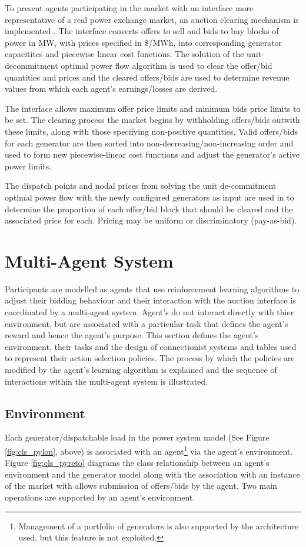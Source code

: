 To present agents participating in the market with an interface more
representative of a real power exchange market, an auction clearing
mechanism is implemented \cite[p.92]{pserc:mp_manual}.  The interface
converts offers to sell and bids to buy blocks of power in MW, with prices
specified in \$/MWh, into corresponding generator capacitites and piecewise
linear cost functions.  The solution of the unit-decommitment optimal power
flow algorithm is used to clear the offer/bid quantities and prices and the
cleared offers/bids are used to determine revenue values from which each
agent's earnings/losses are derived.

The interface allows maximum offer price limits and minimum bids price limits
to be set.  The clearing process the market begins by withholding offers/bids
outwith these limits, along with those specifying non-positive quantities.
Valid offers/bids for each generator are then sorted into
non-decreasing/non-increasing order and used to form new piecewise-linear cost
functions and adjust the generator's active power limits.

The dispatch points and nodal prices from solving the unit de-commitment
optimal power flow with the newly configured generators as input are used in
to determine the proportion of each offer/bid block that should be
cleared and the associated price for each.  Pricing may be uniform or
discriminatory (pay-as-bid).

\section{Multi-Agent System}
\label{sec:mas}
Participants are modelled as agents that use reinforcement learning algorithms
to adjust their bidding behaviour and their interaction with the auction
interface is coordinated by a multi-agent system.  Agent's do not interact
directly with thier environment, but are associated with a particular task
that defines the agent's reward and hence the agent's purpose.  This section
defines the agent's environment, their tasks and the design of connectionist
systems and tables used to represent their action selection policies.  The
process by which the policies are modified by the agent's learning algorithm is
explained and the sequence of interactions within the multi-agent system is
illustrated.

\subsection{Environment}
Each generator/dispatchable load in the power system model (See Figure
\ref{fig:cls_pylon}, above) is associated with an agent\footnote{Management of
a portfolio of generators is also supported by the architecture used, but this
feature is not exploited.} via the agent's environment.  Figure
\ref{fig:cls_pyreto} diagrams the class relationship between an agent's
environment and the generator model along with the association with an instance
of the market with allows submission of offers/bids by the agent. Two main
operations are supported by an agent's environment.

